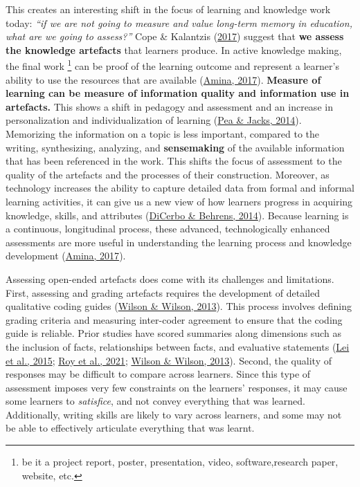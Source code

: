 \documentclass[letterpaper, nobind]{templates/ociamthesis}
\begin{document}
This creates an interesting shift in the focus of learning and knowledge
work today: \emph{``if we are not going to measure and value long-term memory in education, what are we going to assess?''}
Cope \& Kalantzis (\protect\hyperlink{ref-cope2017elearningc}{2017}) suggest that \textbf{we assess the knowledge artefacts} that learners
produce. In active knowledge making, the final work \footnote{
  be it a project report, poster, presentation, video, software,research paper, website, etc.} can be proof of
the learning outcome and represent a learner's ability to use the
resources that are available (\protect\hyperlink{ref-amina2017active}{Amina, 2017}). \textbf{Measure of learning can be measure of information quality and information use in artefacts.} This shows a shift in pedagogy and assessment and an
increase in personalization and individualization of learning
(\protect\hyperlink{ref-pea2014learning}{Pea \& Jacks, 2014}). Memorizing the information on a topic is less
important, compared to the writing, synthesizing, analyzing, and
\textbf{sensemaking} of the available information that has been referenced in
the work. This shifts the focus of assessment to the quality of the
artefacts and the processes of their construction. Moreover, as
technology increases the ability to capture detailed data from formal
and informal learning activities, it can give us a new view of how
learners progress in acquiring knowledge, skills, and attributes
(\protect\hyperlink{ref-dicerbo2014impacts}{DiCerbo \& Behrens, 2014}). Because learning is a continuous, longitudinal
process, these advanced, technologically enhanced assessments are more
useful in understanding the learning process and knowledge development
(\protect\hyperlink{ref-amina2017active}{Amina, 2017}).

Assessing open-ended artefacts does come with its challenges and
limitations. First, assessing and grading artefacts requires the
development of detailed qualitative coding guides
(\protect\hyperlink{ref-wilson2013comparison}{Wilson \& Wilson, 2013}). This process involves defining grading criteria
and measuring inter-coder agreement to ensure that the coding guide is
reliable. Prior studies have scored summaries along dimensions such as
the inclusion of facts, relationships between facts, and evaluative
statements (\protect\hyperlink{ref-lei2015effect}{Lei et al., 2015}; \protect\hyperlink{ref-roy2021note}{Roy et al., 2021}; \protect\hyperlink{ref-wilson2013comparison}{Wilson \& Wilson, 2013}).
Second, the quality of responses may be difficult to compare across
learners. Since this type of assessment imposes very few constraints on
the learners' responses, it may cause some learners to \emph{satisfice}, and
not convey everything that was learned. Additionally, writing skills are
likely to vary across learners, and some may not be able to effectively
articulate everything that was learnt.
\end{document}
